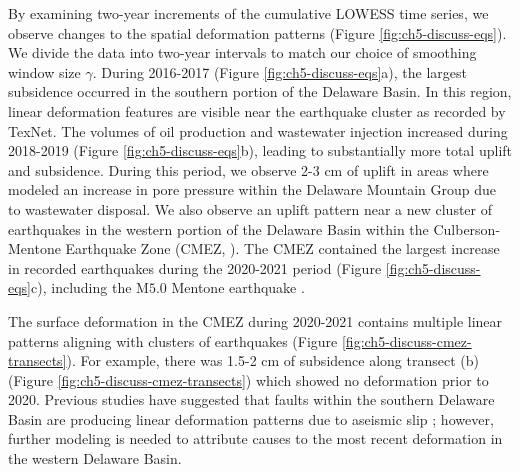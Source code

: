 \FloatBarrier




By examining two-year increments of the cumulative LOWESS time series, we observe changes to the spatial deformation patterns (Figure \ref{fig:ch5-discuss-eqs}).
We divide the data into two-year intervals to match our choice of smoothing window size $ \gamma $.
During 2016-2017 (Figure \ref{fig:ch5-discuss-eqs}a), the largest subsidence occurred in the southern portion of the Delaware Basin. In this region, linear deformation features are visible near the earthquake cluster as recorded by TexNet.
The volumes of oil production and wastewater injection increased during 2018-2019 (Figure \ref{fig:ch5-discuss-eqs}b), leading to substantially more total uplift and subsidence. 
During this period, we observe 2-3 cm of uplift in areas where \cite{Ge2022RecentWaterDisposal} modeled an increase in pore pressure within the Delaware Mountain Group due to wastewater disposal.
We also observe an uplift pattern near a new cluster of earthquakes in the western portion of the Delaware Basin within the Culberson-Mentone Earthquake Zone (CMEZ, \cite{Hennings2021StabilityFaultSystems}).
The CMEZ contained the largest increase in recorded earthquakes during the 2020-2021 period (Figure \ref{fig:ch5-discuss-eqs}c), including the M$ 5.0 $ Mentone earthquake \citep{Skoumal2020InducedMw5.0}. 

The surface deformation in the CMEZ during 2020-2021 contains multiple linear patterns aligning with clusters of earthquakes (Figure \ref{fig:ch5-discuss-cmez-transects}). For example, there was 1.5-2 cm of subsidence along transect (b) (Figure \ref{fig:ch5-discuss-cmez-transects}) which showed no deformation prior to 2020.
Previous studies have suggested that faults within the southern Delaware Basin are producing linear deformation patterns due to aseismic slip  \citep{Pepin2022ShallowAseismicSlip}; however, further modeling is needed to attribute causes to the most recent deformation in the western Delaware Basin.


